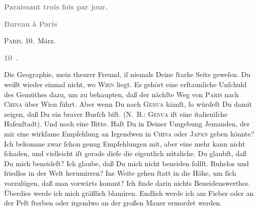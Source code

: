 \begin{ledgroupsized}[t]{13cm}
           \pstart
           \begin{otherlanguage}{french}\textcolor{gray}{\textbf{\textbf{Paraissant trois fois par jour.}}}\end{otherlanguage}\pend
           \pstart
           \begin{otherlanguage}{french}\textcolor{gray}{\textbf{\textbf{Bureau à Paris}}}\end{otherlanguage}\hfill \textsc{Paris}, 10. März.\pend
           \pstart
           \begin{otherlanguage}{french}\textcolor{gray}{\textbf{\textbf{10 .}}}\end{otherlanguage}\pend
           \pstart
           Die Geographie, mein theurer Freund, iſ niemals Deine
               ſtarke Seite geweſen. Du weißt wieder einmal nicht, wo \textsc{Wien} liegt. Es gehört eine erſtaunliche Unſchuld des Gemüthes dazu, um zu behaupten,
               daß der nächſte Weg von \textsc{Paris} nach \textsc{China} über Wien führt. Aber wenn Du nach \textsc{Genua} kämſt, ſo würdeſt Du damit zeigen, daß Du ein braver Burſch biſt. \introOben{}(\textsc{N. B.: Genua} iſt eine italieniſche
                  Hafenſtadt).\introOben{}\pend
           \pstart
            Und noch eine Bitte. Haſt Du in Deiner Umgebung Jemanden, {\pb}der mir eine wirkſame Empfehlung an Irgendwen in \textsc{China} oder \textsc{Japan} geben könnte? Ich bekomme zwar ſchon genug Empfehlungen mit, aber eine mehr
               kann nicht ſchaden, und vielleicht iſt gerade dieſe die eigentlich\strikeout{\textcolor{gray}{e}} nützliche.\pend
           \pstart
           Du glaubſt, daß Du mich beneideſt? Ich glaube, daß Du mich nicht beneiden ſollſt.
               Ruhelos und friedlos in der Welt herumirren?  Ins Weite gehen ſtatt in die Höhe, um ſich
               vorzulügen, daß man {\pb}vorwärts kommt? Ich finde darin
               nichts Beneidenswerthes. Überdies werde ich mich gräßlich  blamiren. Endlich werde ich \strikeout{\textcolor{gray}{a}} am Fieber \introOben{}oder\introOben{} an der Peſt  ſterben oder irgendwo an der großen Mauer ermordet werden.\pend

\end{ledgroupsized}
